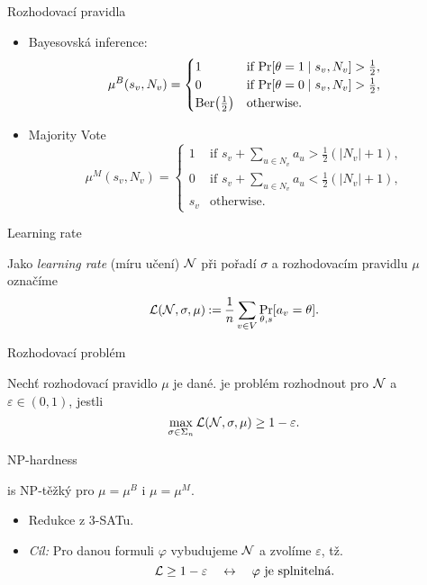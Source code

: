 \documentclass [14pt,xcolor=dvipsnames,aspectratio=169]{beamer}
\def\problemClass{\textsf}
\def\np{\problemClass{NP}}
\begin{document}
\begin{frame}{Rozhodovací pravidla}
    \begin{itemize}
        \item<1-> Bayesovská inference: \[
    \mu^B(s_v, N_v) = \begin{cases}
        1 & \text{if $\pr{\theta = 1 \suchthat s_v, N_v} > \frac 12$}, \\
        0 & \text{if $\pr{\theta = 0 \suchthat s_v, N_v} > \frac 12$}, \\
        \berd{\frac 12} & \text{otherwise.}
    \end{cases}
        \]
        \item<2-> Majority Vote \[
    \mu^M(s_v, N_v) = \begin{cases}
        1 & \text{if $s_v + \sum_{u \in N_v} a_u > \frac 12 (|N_v| + 1)$}, \\
        0 & \text{if $s_v + \sum_{u \in N_v} a_u < \frac 12 (|N_v| + 1)$}, \\
				s_v & \text{otherwise.}
    \end{cases}
        \]
    \end{itemize}
\end{frame}

\begin{frame}{Learning rate}
\begin{defi}
    Jako \emph{learning rate} (míru učení) $ \network $ při pořadí $ \sigma $ a rozhodovacím pravidlu $\mu$ označíme \[
		\clr \network \sigma \mu \deq  \frac 1n\sum_{v \in V} \Pr_{\theta, s}[a_v = \theta].
	\]
\end{defi}
\end{frame}

\begin{frame}{Rozhodovací problém}
\begin{defi}[{\netlearn{}}]
        Nechť \alert<2>{rozhodovací pravidlo $\mu$} je dané.
        \netlearn{} je problém rozhodnout pro \alert<3>{$ \network $} a \alert<3>{$ \varepsilon \in (0,1)$}, jestli \[
            \max_{\sigma \in \Sigma_n} \lr \network \sigma \mu \geq 1-\varepsilon.
        \]
\end{defi}
\end{frame}

\begin{frame}{\np{}-hardness}
    \begin{thm}
        \netlearn{} is \np{}-těžký pro $ \mu = \mu^B $ i $ \mu = \mu^M $.
    \end{thm}
    \begin{itemize}
        \item<2-> Redukce z 3-SATu.
        \item<3-> \emph{Cíl:} Pro danou formuli $\varphi$ vybudujeme $\network$ a zvolíme $\varepsilon$, tž. \[
           \mathcal{L} \geq 1-\varepsilon \quad\iff\quad \text{$ \varphi $ je splnitelná.}
        \] 
    \end{itemize}
\end{frame}
\end{document}

